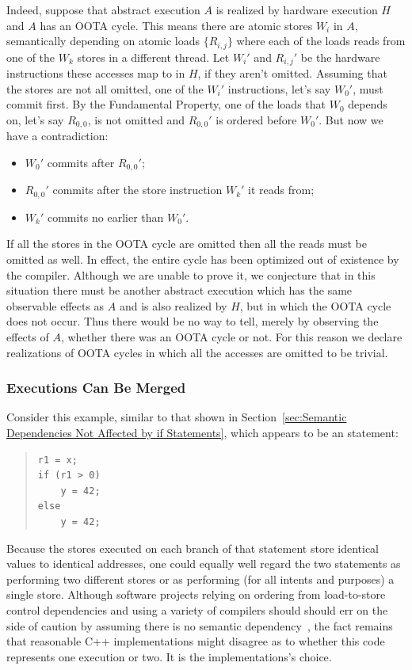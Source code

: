 \documentclass[10]{article}
\begin{document}
Indeed, suppose that abstract execution $A$ is realized by hardware
execution $H$ and $A$ has an OOTA cycle.
This means there are atomic stores $W_i$ in $A$,
semantically depending on atomic loads
$\{R_{i,j}\}$ where each of the loads reads from one of the $W_k$
stores in a different thread.
Let $W_i'$ and $R_{i,j}'$ be the hardware instructions these accesses
map to in $H$, if they aren't omitted.
Assuming that the stores are not all omitted,
one of the $W_i'$ instructions, let's say $W_0'$, must commit first.
By the Fundamental Property, one of the loads that $W_0$ depends on,
let's say $R_{0,0}$, is not omitted and $R_{0,0}'$ is ordered before $W_0'$.
But now we have a contradiction:
\begin{itemize}
\item	$W_0'$ commits after $R_{0,0}'$;
\item	$R_{0,0}'$ commits after the store instruction $W_k'$ it reads from;
\item	$W_k'$ commits no earlier than $W_0'$.
\end{itemize}

If all the stores in the OOTA cycle are omitted then all the reads
must be omitted as well.
In effect, the entire cycle has been optimized
out of existence by the compiler.
Although we are unable to prove it, we conjecture that in this
situation there must be another abstract execution which has the
same observable effects as $A$ and is also realized by $H$, but in
which the OOTA cycle does not occur.
Thus there would be no way to tell, merely by observing the effects of
$A$, whether there was an OOTA cycle or not.
For this reason we declare realizations of OOTA cycles in which
all the accesses are omitted to be trivial.

\subsubsection{Executions Can Be Merged}
\label{sec:Executions Can Be Merged}

Consider this example, similar to that shown in
Section~\ref{sec:Semantic Dependencies Not Affected by if Statements},
which appears to be an  statement:

\begin{quote}
\begin{verbatim}
r1 = x;
if (r1 > 0)
    y = 42;
else
    y = 42;
\end{verbatim}
\end{quote}

Because the stores executed on each branch of that  statement store
identical values to identical addresses, one could equally well regard
the two statements as performing two different stores or as performing
(for all intents and purposes) a single store.
Although software projects relying on ordering from load-to-store control
dependencies and using a variety of compilers should should err on the
side of caution by assuming there is no semantic
dependency~\cite{Howells2009membartxt},
the fact remains that reasonable C++ implementations might disagree as
to whether this code represents one execution or two.
It is the implementations's choice.
\end{document}
